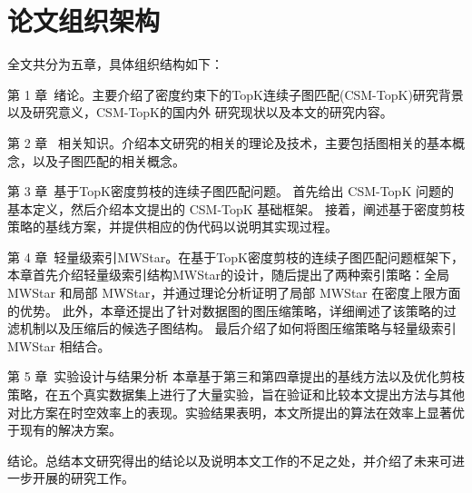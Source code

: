 \section{论文组织架构}
全文共分为五章，具体组织结构如下：

第 1 章\ 绪论。主要介绍了密度约束下的TopK连续子图匹配(CSM-TopK)研究背景以及研究意义，CSM-TopK的国内外
研究现状以及本文的研究内容。

第 2 章 \ 相关知识。介绍本文研究的相关的理论及技术，主要包括图相关的基本概念，以及子图匹配的相关概念。

第 3 章\ 基于TopK密度剪枝的连续子图匹配问题。
首先给出 CSM-TopK 问题的基本定义，然后介绍本文提出的 CSM-TopK 基础框架。
接着，阐述基于密度剪枝策略的基线方案，并提供相应的伪代码以说明其实现过程。

第 4 章\ 轻量级索引MWStar。在基于TopK密度剪枝的连续子图匹配问题框架下，本章首先介绍轻量级索引结构MWStar的设计，随后提出了两种索引策略：全局 MWStar 和局部 MWStar，并通过理论分析证明了局部 MWStar 在密度上限方面的优势。
此外，本章还提出了针对数据图的图压缩策略，详细阐述了该策略的过滤机制以及压缩后的候选子图结构。
最后介绍了如何将图压缩策略与轻量级索引 MWStar 相结合。

第 5 章\ 实验设计与结果分析
本章基于第三和第四章提出的基线方法以及优化剪枝策略，在五个真实数据集上进行了大量实验，旨在验证和比较本文提出方法与其他对比方案在时空效率上的表现。实验结果表明，本文所提出的算法在效率上显著优于现有的解决方案。

结论。总结本文研究得出的结论以及说明本文工作的不足之处，并介绍了未来可进一步开展的研究工作。
